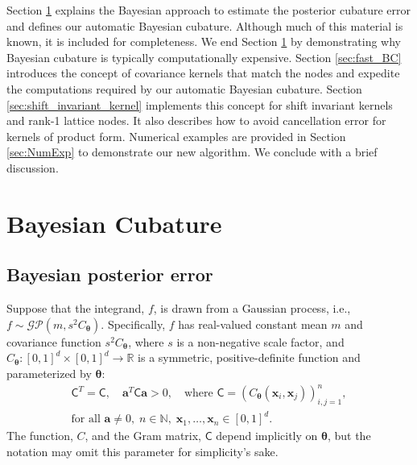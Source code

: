 \documentclass[twocolumn]{svjour3}          %
\newcommand{\bm}[1]{\boldsymbol{#1}}
\newcommand{\vtheta}{{\bm{\theta}}}
\newcommand{\va}{\bm{a}}
\newcommand{\vx}{\bm{x}}
\newcommand{\mC}{\mathsf{C}}
\begin{document}
Section \ref{sec:BC} explains the Bayesian approach to estimate the posterior cubature error and defines our automatic Bayesian cubature. Although much of this material is known, it is included for completeness.  We end Section \ref{sec:BC}  by demonstrating why Bayesian cubature is typically computationally expensive.
Section \ref{sec:fast_BC}  introduces the concept of covariance kernels that match the nodes and expedite the computations required by our automatic Bayesian cubature. 
Section \ref{sec:shift_invariant_kernel} implements this concept for shift invariant kernels and rank-1 lattice nodes.  It also describes how to avoid cancellation error for kernels of product form.  Numerical examples are provided in Section \ref{sec:NumExp} to demonstrate our new algorithm.  We conclude with a brief discussion.



\section{Bayesian Cubature} \label{sec:BC} 


\subsection{Bayesian posterior error}
\label{sec:BayesPostErr}

Suppose that the integrand, $f$, is drawn from a Gaussian process, i.e., $f \sim \mathcal{GP}(m,s^2 C_\vtheta)$.  Specifically, $f$ has real-valued constant mean $m$ and covariance function $s^2C_\vtheta$, where $s$ is a non-negative scale factor, and $C_\vtheta: [0,1]^d \times [0,1]^d \to \mathbb{R} $ is a symmetric, positive-definite function and parameterized by $\vtheta$:
\begin{multline} \label{FJH:eq:CondPosDef}
\mC^T = \mC,  \quad \va^T \mC \va > 0, \quad \text{where }  \mC = \left(  C_\vtheta(\vx_i,\vx_j)  \right)_{i,j=1}^n,\\
 \text{for all } \va \ne 0, \;
 n\in \mathbb{N}, \; \vx_1, \ldots, \vx_n \in [0,1]^d.
\end{multline}
The function, $C$, and the Gram matrix, $\mC$ depend implicitly on $\vtheta$, but the notation may omit this parameter for simplicity's sake.
\end{document}
